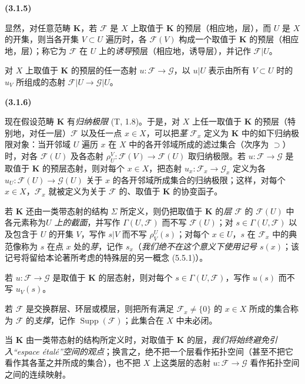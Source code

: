 \documentclass[UTF8,fontset=none,11pt,oneside,openany]{ctexbook}
\newenvironment{env}[1][]{%
  \par\medskip\noindent\textbf{(#1)}\ %
}{\par}
\newcommand{\oldpage}[2][]{%
  \hypertarget{ega-source-page-#1-#2}{}%
  \marginnote{\scriptsize\textbf{#1}~|~#2}\ignorespaces}
\let\EGAOriginalLabel\label
\renewcommand{\label}[1]{\phantomsection\EGAOriginalLabel{#1}}
\begin{document}
\oldpage[0\textsubscript{I}]{25}

\begin{env}[3.1.5]
\label{0.3.1.5-fr}
显然，对任意范畴 $\mathbf{K}$，若 $\mathcal{F}$ 是 $X$ 上取值于 $\mathbf{K}$ 的预层（相应地，层），而 $U$ 是 $X$ 的开集，则当各开集 $V\subset U$ 遍历时，各 $\mathcal{F}(V)$ 构成一个取值于 $\mathbf{K}$ 的预层（相应地，层）；称它为 $\mathcal{F}$ 在 $U$ 上的\emph{诱导}预层（相应地，诱导层），并记作 $\mathcal{F}|U$。

对 $X$ 上取值于 $\mathbf{K}$ 的预层的任一态射 $u:\mathcal{F}\to\mathcal{G}$，以 $u|U$ 表示由所有 $V\subset U$ 时的 $u_V$ 所组成的态射 $\mathcal{F}|U\to\mathcal{G}|U$。
\end{env}

\begin{env}[3.1.6]
\label{0.3.1.6-fr}
现在假设范畴 $\mathbf{K}$ 有\emph{归纳极限} (T, 1.8)。于是，对 $X$ 上任一取值于 $\mathbf{K}$ 的预层（特别地，对任一层）$\mathcal{F}$ 以及任一点 $x\in X$，可以把\emph{茎} $\mathcal{F}_x$ 定义为 $\mathbf{K}$ 中的如下归纳极限对象：当开邻域 $U$ 遍历 $x$ 在 $X$ 中的各开邻域所成的滤过集合（次序为 $\supset$）时，对各 $\mathcal{F}(U)$ 及各态射 $\rho_U^V:\mathcal{F}(V)\to\mathcal{F}(U)$ 取归纳极限。若 $u:\mathcal{F}\to\mathcal{G}$ 是取值于 $\mathbf{K}$ 的预层态射，则对每个 $x\in X$，把态射 $u_x:\mathcal{F}_x\to\mathcal{G}_x$ 定义为各 $u_U:\mathcal{F}(U)\to\mathcal{G}(U)$ 关于 $x$ 的各开邻域所成集合的归纳极限；这样，对每个 $x\in X$，$\mathcal{F}_x$ 就被定义为关于 $\mathcal{F}$ 的、取值于 $\mathbf{K}$ 的协变函子。

若 $\mathbf{K}$ 还由一类带态射的结构 $\Sigma$ 所定义，则仍把取值于 $\mathbf{K}$ 的\emph{层 $\mathcal{F}$} 的 $\mathcal{F}(U)$ 中各元素称为\emph{$U$ 上的截面}，并写作 $\Gamma(U,\mathcal{F})$ 而不写 $\mathcal{F}(U)$；对 $s\in\Gamma(U,\mathcal{F})$ 以及包含于 $U$ 的开集 $V$，写作 $s|V$ 而不写 $\rho_V^U(s)$；对每个 $x\in U$，$s$ 在 $\mathcal{F}_x$ 中的典范像称为 $s$ 在点 $x$ 处的\emph{芽}，记作 $s_x$（\emph{我们绝不在这个意义下使用记号 $s(x)$}；该记号将留给本论著所考虑的特殊层的另一概念 (5.5.1)）。

若 $u:\mathcal{F}\to\mathcal{G}$ 是取值于 $\mathbf{K}$ 的层态射，则对每个 $s\in\Gamma(U,\mathcal{F})$，写作 $u(s)$ 而不写 $u_V(s)$。

若 $\mathcal{F}$ 是交换群层、环层或模层，则把所有满足 $\mathcal{F}_x\neq\{0\}$ 的 $x\in X$ 所成的集合称为 $\mathcal{F}$ 的\emph{支撑}，记作 $\operatorname{Supp}(\mathcal{F})$；此集合在 $X$ 中未必闭。

当 $\mathbf{K}$ 由一类带态射的结构所定义时，对取值于 $\mathbf{K}$ 的层，\emph{我们将始终避免引入“espace étalé”空间的观点}；换言之，绝不把一个层看作拓扑空间（甚至不把它看作其各茎之并所成的集合），也不把 $X$ 上这类层的态射 $u:\mathcal{F}\to\mathcal{G}$ 看作拓扑空间之间的连续映射。
\end{env}
\end{document}
